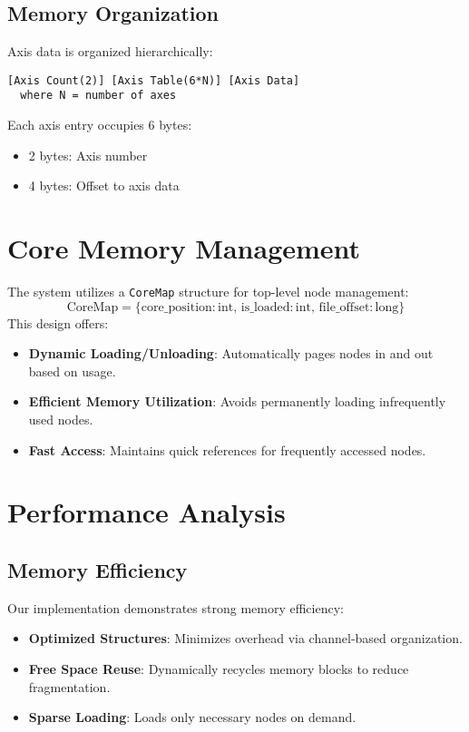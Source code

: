 \documentclass[12pt, a4paper]{article}
\begin{document}
\subsection{Memory Organization}
Axis data is organized hierarchically:
\begin{verbatim}
[Axis Count(2)] [Axis Table(6*N)] [Axis Data]
  where N = number of axes
\end{verbatim}

Each axis entry occupies 6 bytes:
\begin{itemize}
    \item 2 bytes: Axis number
    \item 4 bytes: Offset to axis data
\end{itemize}

\section{Core Memory Management}\label{Sec:CoreMemory}
The system utilizes a \texttt{CoreMap} structure for top-level node management:
\begin{equation}
    \mathrm{CoreMap} = \{\mathrm{core\_position}: \mathrm{int},\, \mathrm{is\_loaded}: \mathrm{int},\, \mathrm{file\_offset}: \mathrm{long}\}
\end{equation}
This design offers:
\begin{itemize}
    \item \textbf{Dynamic Loading/Unloading}: Automatically pages nodes in and out based on usage.
    \item \textbf{Efficient Memory Utilization}: Avoids permanently loading infrequently used nodes.
    \item \textbf{Fast Access}: Maintains quick references for frequently accessed nodes.
\end{itemize}

\section{Performance Analysis}\label{Sec:Performance}
\subsection{Memory Efficiency}
Our implementation demonstrates strong memory efficiency:
\begin{itemize}
    \item \textbf{Optimized Structures}: Minimizes overhead via channel-based organization.
    \item \textbf{Free Space Reuse}: Dynamically recycles memory blocks to reduce fragmentation.
    \item \textbf{Sparse Loading}: Loads only necessary nodes on demand.
\end{itemize}
\end{document}
